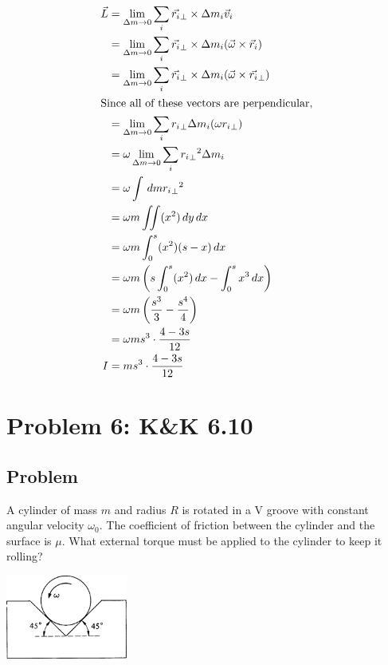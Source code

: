 \documentclass[solutions]{esg8012pset}
\renewcommand{\d}{\,d}
\begin{document}
\begin{enumerate}[(a)]
\begin{align*}
      \vec L & = \lim_{\Delta m\to 0} \sum_{i} \vec {r_i}_{\bot} \times \Delta m_i \vec v_i \\
      & = \lim_{\Delta m\to 0} \sum_{i} \vec {r_i}_{\bot} \times \Delta m_i (\vec \omega \times \vec r_i) \\
      & = \lim_{\Delta m\to 0} \sum_{i} \vec {r_i}_{\bot} \times \Delta m_i (\vec \omega \times \vec {r_i}_{\bot}) \\
    \intertext{Since all of these vectors are perpendicular,}
      & = \lim_{\Delta m\to 0} \sum_{i} {r_i}_{\bot} \Delta m_i (\omega {r_i}_{\bot}) \\
      & = \omega \lim_{\Delta m\to 0} \sum_{i} {{r_i}_{\bot}}^2 \Delta m_i \\
      & = \omega \int \d m {{r_i}_{\bot}}^2 \\
      & = \omega m \iint (x^2)\d y \d x \\
      & = \omega m \int_0^s (x^2)(s-x) \d x \\
      & = \omega m \left(s\int_0^s (x^2) \d x - \int_0^s x^3 \d x\right) \\
      & = \omega m \left(\frac{s^3}{3} - \frac{s^4}{4}\right) \\
      & = \omega m s^3 \cdot \frac{4-3s}{12} \\
    I & = m s^3 \cdot \frac{4-3s}{12}
    \end{align*}
  \end{enumerate}
\section*{Problem 6: K\&K 6.10}
\subsection*{Problem}
  A cylinder of mass $m$ and radius $R$ is rotated in a V groove with constant angular velocity $\omega_{0}$.
The coefficient of friction between the cylinder and the surface is $\mu$. What external torque must be applied to the cylinder to keep it rolling?
  \begin{center}\includegraphics[width=0.3\textwidth]{ps08_4}\end{center}
\end{document}
